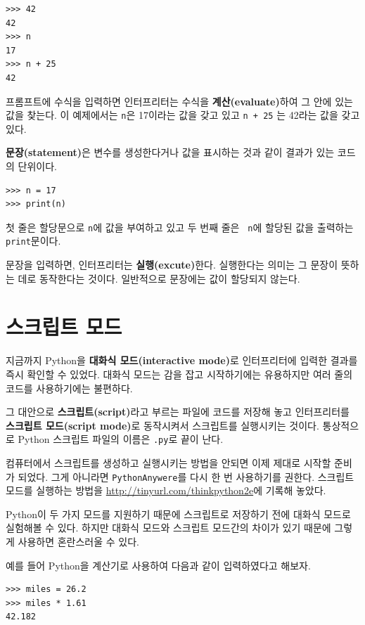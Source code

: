 \documentclass[10pt]{book}
\begin{document}
\begin{verbatim}
>>> 42
42
>>> n
17
>>> n + 25
42
\end{verbatim}
%
프롬프트에 수식을 입력하면 인터프리터는 수식을 {\bf
계산(evaluate)}하여 그 안에 있는 값을 찾는다.  이 예제에서는 {\tt n}은
17이라는 값을 갖고 있고 {\tt n + 25} 는 42라는 값을 갖고 있다.

{\bf 문장(statement)}은 변수를 생성한다거나 값을 표시하는 것과 같이
결과가 있는 코드의 단위이다.

\begin{verbatim}
>>> n = 17
>>> print(n)
\end{verbatim}
%
첫 줄은 할당문으로 {\tt n}에 값을 부여하고 있고 두 번째 줄은 {\tt
  n}에 할당된 값을 출력하는 \texttt{print}문이다.

문장을 입력하면, 인터프리터는 {\bf 실행(excute)}한다. 실행한다는 의미는
그 문장이 뜻하는 데로 동작한다는 것이다.  일반적으로 문장에는 값이 할당되지 않는다. 


\section{스크립트 모드}

지금까지 Python을 {\bf 대화식 모드(interactive mode)}로 인터프리터에
입력한 결과를 즉시 확인할 수 있었다.  대화식 모드는 감을 잡고
시작하기에는 유용하지만 여러 줄의 코드를 사용하기에는 불편하다.

그 대안으로 {\bf 스크립트(script)}라고 부르는 파일에 코드를 저장해 놓고 인터프리터를 
{\bf 스크립트 모드(script mode)}로 동작시켜서 스크립트를 실행시키는 것이다. 
통상적으로 Python 스크립트 파일의 이름은 {\tt .py}로 끝이 난다. 

컴퓨터에서 스크립트를 생성하고 실행시키는 방법을 안되면 이제 제대로
시작할 준비가 되었다.  그게 아니라면 \texttt{PythonAnywere}를 다시 한
번 사용하기를 권한다.  스크립트 모드를 실행하는 방법을
\url{http://tinyurl.com/thinkpython2e}에 기록해 놓았다.

Python이 두 가지 모드를 지원하기 때문에 스크립트로 저장하기 전에 대화식
모드로 실험해볼 수 있다.  하지만 대화식 모드와 스크립트 모드간의 차이가
있기 때문에 그렇게 사용하면 혼란스러울 수 있다.

예를 들어 Python을 계산기로 사용하여 다음과 같이 입력하였다고 해보자. 

\begin{verbatim}
>>> miles = 26.2
>>> miles * 1.61
42.182
\end{verbatim}
\end{document}
